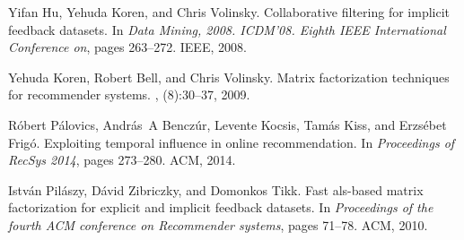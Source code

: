 \documentclass[10pt]{article}
\begin{document}
\begin{thebibliography}{10}




Yifan Hu, Yehuda Koren, and Chris Volinsky.
\newblock Collaborative filtering for implicit feedback datasets.
\newblock In {\em Data Mining, 2008. ICDM'08. Eighth IEEE International
  Conference on}, pages 263--272. IEEE, 2008.


Yehuda Koren, Robert Bell, and Chris Volinsky.
\newblock Matrix factorization techniques for recommender systems.
, (8):30--37, 2009.

R{\'o}bert P{\'a}lovics, Andr{\'a}s~A Bencz{\'u}r, Levente Kocsis, Tam{\'a}s
  Kiss, and Erzs{\'e}bet Frig{\'o}.
\newblock Exploiting temporal influence in online recommendation.
\newblock In {\em Proceedings of RecSys 2014}, pages 273--280. ACM, 2014.


Istv{\'a}n Pil{\'a}szy, D{\'a}vid Zibriczky, and Domonkos Tikk.
\newblock Fast als-based matrix factorization for explicit and implicit
  feedback datasets.
\newblock In {\em Proceedings of the fourth ACM conference on Recommender
  systems}, pages 71--78. ACM, 2010.


\end{thebibliography}
\end{document}
